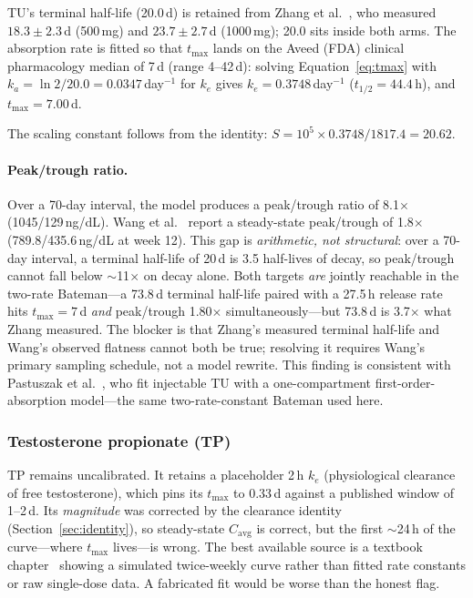 \documentclass[11pt,a4paper]{article}
\begin{document}
TU's terminal half-life (20.0\,d) is retained from Zhang et
al.~\cite{zhang1998}, who measured $18.3 \pm 2.3$\,d (500\,mg) and
$23.7 \pm 2.7$\,d (1000\,mg); 20.0 sits inside both arms. The absorption
rate is fitted so that $t_{\max}$ lands on the Aveed (FDA) clinical
pharmacology median of 7\,d (range 4--42\,d): solving
Equation~\ref{eq:tmax} with $k_a = \ln 2 / 20.0 = 0.0347$\,day$^{-1}$
for $k_e$ gives $k_e = 0.3748$\,day$^{-1}$ ($t_{1/2} = 44.4$\,h), and
$t_{\max} = 7.00$\,d.

The scaling constant follows from the identity:
$S = 10^5 \times 0.3748 / 1817.4 = 20.62$.

\paragraph{Peak/trough ratio.} Over a 70-day interval, the model
produces a peak/trough ratio of 8.1$\times$ (1045/129\,ng/dL). Wang et
al.~\cite{wang2010} report a steady-state peak/trough of 1.8$\times$
(789.8/435.6\,ng/dL at week 12). This gap is \emph{arithmetic, not
structural}: over a 70-day interval, a terminal half-life of 20\,d is
3.5 half-lives of decay, so peak/trough cannot fall below $\sim$11$\times$
on decay alone. Both targets \emph{are} jointly reachable in the
two-rate Bateman---a 73.8\,d terminal half-life paired with a 27.5\,h
release rate hits $t_{\max} = 7$\,d \emph{and} peak/trough 1.80$\times$
simultaneously---but 73.8\,d is 3.7$\times$ what Zhang measured. The
blocker is that Zhang's measured terminal half-life and Wang's observed
flatness cannot both be true; resolving it requires Wang's primary
sampling schedule, not a model rewrite. This finding is consistent with
Pastuszak et al.~\cite{pastuszak2021}, who fit injectable TU with a
one-compartment first-order-absorption model---the same two-rate-constant
Bateman used here.

\subsubsection{Testosterone propionate (TP)}

TP remains uncalibrated. It retains a placeholder 2\,h $k_e$
(physiological clearance of free testosterone), which pins its
$t_{\max}$ to 0.33\,d against a published window of 1--2\,d. Its
\emph{magnitude} was corrected by the clearance identity
(Section~\ref{sec:identity}), so steady-state $C_{\mathrm{avg}}$ is
correct, but the first $\sim$24\,h of the curve---where $t_{\max}$
lives---is wrong. The best available source is a textbook
chapter~\cite{behre2004} showing a simulated twice-weekly curve rather
than fitted rate constants or raw single-dose data. A fabricated fit
would be worse than the honest flag.
\end{document}
